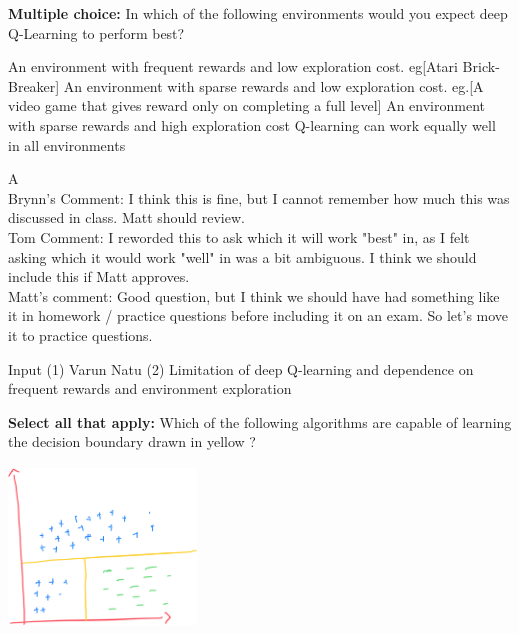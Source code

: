 \begin{questions}
\question[1] \textbf{Multiple choice:} In which of the following environments would you expect deep Q-Learning to perform best?
    {%
    \checkboxchar{$\Box$} %
    \begin{checkboxes}
     \choice An environment with frequent rewards and low exploration cost. eg[Atari Brick-Breaker]  
     \choice An environment with sparse rewards and low exploration cost. eg.[A video game that gives reward only on completing a full level]
     \choice An environment with sparse rewards and high exploration cost 
     \choice Q-learning can work equally well in all environments
    \end{checkboxes}
    }
    \begin{soln}
    A\\
    
    Brynn's Comment: I think this is fine, but I cannot remember how much this was discussed in class. Matt should review. \\ Tom Comment: I reworded this to ask which it will work "best" in, as I felt asking which it would work "well" in was a bit ambiguous.  I think we should include this if Matt approves. \\ Matt's comment: Good question, but I think we should have had something like it in homework / practice questions before including it on an exam. So let's move it to practice questions.
    \end{soln}
    \begin{qauthor}
    Input (1) Varun Natu (2) Limitation of deep Q-learning and dependence on frequent rewards and environment exploration
    \end{qauthor}
\question[1] \textbf{Select all that apply:} Which of the following algorithms are capable of learning the decision boundary drawn in yellow ?
\\ \includegraphics[width=5cm,height=5cm]{figures/decision_boundaries.png}
    {%
    \checkboxchar{$\Box$} %
    \begin{checkboxes}

\end{checkboxes}}
\end{questions}
